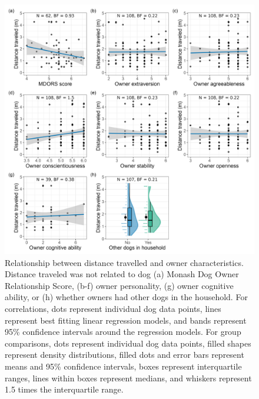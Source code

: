 \documentclass[
  pub,floatsintext]{apa6}
\begin{document}
\begin{figure}

{\centering \includegraphics[width=0.95\linewidth]{figures/owner_characteristics} 

}

\caption{Relationship between distance travelled and owner characteristics. Distance traveled was not related to dog (a) Monash Dog Owner Relationship Score, (b-f) owner personality, (g) owner cognitive ability, or (h) whether owners had other dogs in the household. For correlations, dots represent individual dog data points, lines represent best fitting linear regression models, and bands represent 95\% confidence intervals around the regression models. For group comparisons, dots represent individual dog data points, filled shapes represent density distributions, filled dots and error bars represent means and 95\% confidence intervals, boxes represent interquartile ranges, lines within boxes represent medians, and whiskers represent 1.5 times the interquartile range. }\label{fig:owner-char}
\end{figure}
\end{document}
